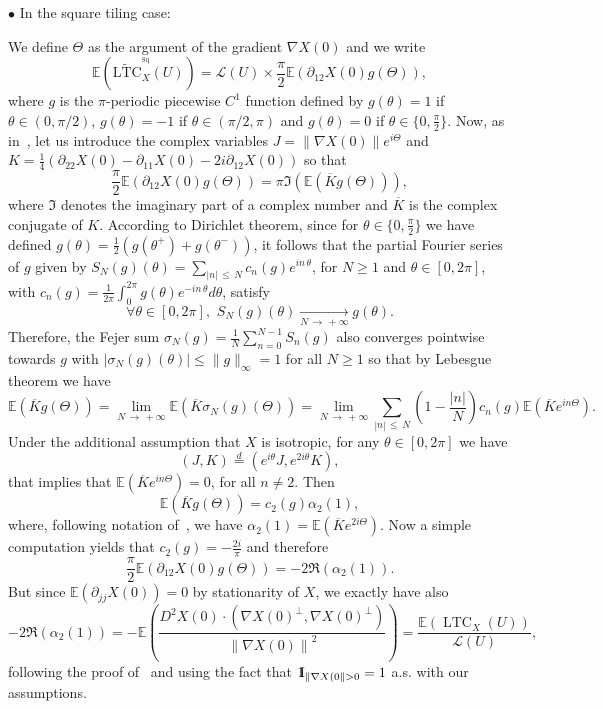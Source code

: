\documentclass[AHL,Unicode,longabstracts,published]{cedram}
\newcommand{\E}{\mathbb{E}}
\newcommand{\ind}{{1\!\!\mathrm{I}}}
\DeclareMathOperator{\LTC}{LTC}
\DeclareMathOperator{\Sq}{Sq}
\newcommand{\tLTC}{\widetilde{\mathrm{LTC}}}
\newcommand{\calL}{\mathcal{L}}
\let\oldforall\forall
\renewcommand*{\forall}{\mathrel{\oldforall}}
\begin{document}
$\bullet$ In the square tiling case:

We define $\Theta$ as the argument of the gradient $\nabla X(0)$ and we write
\[
\E\left(\tLTC^{^{\Sq}}_{X}(U)\right)=\calL(U)\times \frac{\pi}{2}\E\left(\partial_{12}X(0)g(\Theta)\right),
\]
where $g$ is the $\pi$-periodic piecewise $C^1$ function defined by $g(\theta)=1$ if $\theta\in (0,\pi/2)$, $g(\theta)=-1$ if $\theta\in (\pi/2,\pi)$ and $g(\theta)=0$ if $\theta\in\{0,\frac{\pi}{2}\}$. Now, as in~\cite[the proof of Theorem~2]{BD-Geometry-published}, let us introduce the complex variables $J=\|\nabla X(0)\|e^{i\Theta}$ and\linebreak$K=\frac{1}{4}(\partial_{22}X(0)-\partial_{11}X(0)-2i\partial_{12}X(0))$ so that
\[
\frac{\pi}{2}\E\left(\partial_{12}X(0)g(\Theta)\right)=\pi\Im\left(\E\left(\overline{K}g(\Theta)\right)\right),
\]
where $\Im$ denotes the imaginary part of a complex number and $\overline{K}$ is the complex conjugate of $K$. According to Dirichlet theorem, since for $\theta\in \{0,\frac{\pi}{2}\}$ we have defined $g(\theta)=\frac{1}{2}(g(\theta^+)+g(\theta^-))$, it follows that the partial Fourier series of $g$ given by $S_N(g)(\theta)=\sum_{|n|\,\le\,N}c_n(g)e^{in\,\theta}$, for $N\ge 1$ and $\theta \in [0,2\pi]$, with $c_n(g)=\frac{1}{2\pi}\int_0^{2\pi}g(\theta)e^{-in\,\theta}d\theta$, satisfy
\[
\forall \theta \in [0,2\pi],\,\, S_N(g)(\theta)\underset{N\,\rightarrow\,+\infty}{\longrightarrow} g(\theta).
\]
Therefore, the Fejer sum $\sigma_N(g)=\frac{1}{N}\sum_{n=0}^{N-1}S_n(g)$ also converges pointwise towards $g$ with $|\sigma_N(g)(\theta)|\le \|g\|_\infty=1$ for all $N\ge 1$ so that by Lebesgue theorem we have
\[
\E\left(\overline{K}g(\Theta)\right)=\lim_{N\,\rightarrow\,+\infty}\E\left(\overline{K}\sigma_N(g)(\Theta)\right)=\lim_{N\,\rightarrow\,+\infty}\sum_{|n|\,\le\,N}\left(1-\frac{|n|}{N}\right)c_n(g)\E\left(\overline{K}e^{in\Theta}\right).
\]
Under the additional assumption that $X$ is isotropic, for any $\theta\in [0,2\pi]$ we have
\[
(J,K)\stackrel{d}{=}\left(e^{i\theta}J,e^{2i\theta}K\right),
\]
that implies that $\E\left(\overline{K}e^{in\Theta}\right)=0$, for all $n\neq 2$. Then
\[
\E\left(\overline{K}g(\Theta)\right)=c_2(g)\alpha_2(1),
\]
where, following notation of~\cite{BD-Geometry-published}, we have $\alpha_2(1)=\E(\overline{K}e^{2i\Theta})$. Now a simple computation yields that $c_2(g)=-\frac{2i}{\pi}$ and therefore
\[
\frac{\pi}{2}\E\left(\partial_{12}X(0)g(\Theta)\right)=-2\Re(\alpha_2(1)).
\]
But since $\E(\partial_{jj}X(0))=0$ by stationarity of $X$, we exactly have also
\[
-2\Re(\alpha_2(1))=-\E\left(\frac{D^2X(0)\cdot \left(\nabla X(0)^\perp,\nabla X(0)^\perp\right)}{\left\|\nabla X(0)\right\|^2}\right)=\frac{\E(\LTC_X(U))}{{\calL}(U)},
\]
following the proof of~\cite[Theorem~2]{BD-Geometry-published} and using the fact that $\ind_{\|\nabla X(0\|>0}\linebreak=1$ a.s. with our assumptions.
\vspace{3pt}
\end{document}
